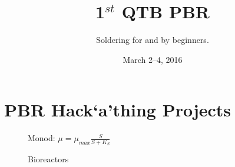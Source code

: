 \documentclass[12pt,a4paper]{scrartcl}
\title{1$^{st}$ QTB PBR \hack{}}
\subtitle{Soldering for and by beginners.}
\date{March 2--4, 2016}
\newcommand{\hack}[0]{Hack`a'thing}
\begin{document}
\maketitle
\tableofcontents
\newpage

\section{PBR \hack{} Projects}
\label{proj}

\begin{figure}[ht]
  \begin{minipage}{.49\textwidth}
  \end{minipage}
  \begin{minipage}{.49\textwidth}
    \centering Monod: $\mu = \mu_{max} \frac{S}{S+K_S}$\\
  \end{minipage}
\caption[]{Bioreactors}
\end{figure}
\end{document}
